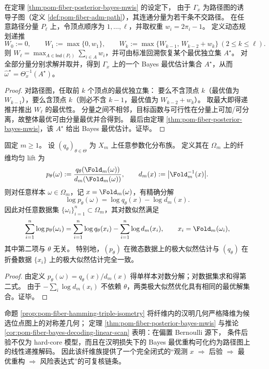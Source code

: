 \begin{corollary}\label{cor:pom-fiber-bayes-decoding-linear-scan}
在定理 \ref{thm:pom-fiber-posterior-bayes-mwis} 的设定下，
由于 \(\Gamma_x\) 为路径图的诱导子图（定义 \ref{def:pom-fiber-adm-path}），其连通分量为若干条不交路径。
在任意路径分量 \(P_\ell\) 上，令顶点顺序为 \(1,\dots,\ell\)，并取权重 \(w_i=2\pi_i-1\)。
定义动态规划递推
\[
W_0:=0,\qquad
W_1:=\max\{0,w_1\},\qquad
W_k:=\max\{W_{k-1},\,W_{k-2}+w_k\}\ (2\le k\le \ell).
\]
则 \(W_\ell=\max_{A\in\mathsf{Ind}(P_\ell)}\sum_{i\in A}w_i\)，并可由标准回溯恢复某个最优独立集 \(A^\star\)。
对全部分量分别求解并取并，得到 \(\Gamma_x\) 上的一个 Bayes 最优估计集合 \(A^\star\)，从而 \(\widehat\omega^\star=\Theta_x^{-1}(A^\star)\)。
\end{corollary}
\begin{proof}
对路径图，任取前 \(k\) 个顶点的最优独立集：
要么不含顶点 \(k\)（最优值为 \(W_{k-1}\)），要么含顶点 \(k\)（则必不含 \(k-1\)，最优值为 \(W_{k-2}+w_k\)）。
取最大即得递推并推出 \(W_\ell\) 的最优性。
分量之间不相邻，目标函数与可行性在分量上可加/可分离，故整体最优可由分量最优并合得到。
最后由定理 \ref{thm:pom-fiber-posterior-bayes-mwis}，该 \(A^\star\) 给出 Bayes 最优估计。证毕。
\end{proof}

\begin{proposition}\label{prop:pom-fiber-uniform-lift-mle-equivalence}
固定 \(m\ge 1\)。
设 \((q_\theta)_{\theta\in\Theta}\) 为 \(X_m\) 上任意参数化分布族。
定义其在 \(\Omega_m\) 上的纤维均匀 lift 为
\[
p_\theta(\omega):=\frac{q_\theta(\Fold_m(\omega))}{d_m(\Fold_m(\omega))},
\qquad
d_m(x):=\bigl|\Fold_m^{-1}(x)\bigr|.
\]
则对任意样本 \(\omega\in\Omega_m\)，记 \(x=\Fold_m(\omega)\)，有精确分解
\[
\log p_\theta(\omega)=\log q_\theta(x)-\log d_m(x).
\]
因此对任意数据集 \(\{\omega_i\}_{i=1}^n\subset\Omega_m\)，其对数似然满足
\[
\sum_{i=1}^n\log p_\theta(\omega_i)
=\sum_{i=1}^n\log q_\theta(x_i)-\sum_{i=1}^n\log d_m(x_i),
\qquad x_i=\Fold_m(\omega_i),
\]
其中第二项与 \(\theta\) 无关。
特别地，\((p_\theta)\) 在微态数据上的极大似然估计与 \((q_\theta)\) 在折叠数据 \(\{x_i\}\) 上的极大似然估计完全一致。
\end{proposition}
\begin{proof}
由定义 \(p_\theta(\omega)=q_\theta(x)/d_m(x)\) 得单样本对数分解；对数据集求和得第二式。
由于 \(-\sum_i\log d_m(x_i)\) 不依赖 \(\theta\)，两类极大似然优化具有相同的最优解集合。证毕。
\end{proof}

\begin{remark}[可解析后验推断的基准实例]\label{rem:pom-fiber-hardcore-bayes-baseline}
命题 \ref{prop:pom-fiber-hamming-triple-isometry} 将纤维内的汉明几何严格降维为候选位点图上的对称差几何；
定理 \ref{thm:pom-fiber-posterior-bayes-mwis} 与推论 \ref{cor:pom-fiber-bayes-decoding-linear-scan} 表明：在偏置 Bernoulli 源下，
条件后验不仅为 hard-core 模型，而且在汉明损失下的 Bayes 最优重构可化约为路径图上的线性递推解码。
因此该纤维族提供了一个完全闭式的“观测 \(x\) \(\Rightarrow\) 后验 \(\Rightarrow\) 最优重构 \(\Rightarrow\) 风险表达式”的可复核链条。
\end{remark}


